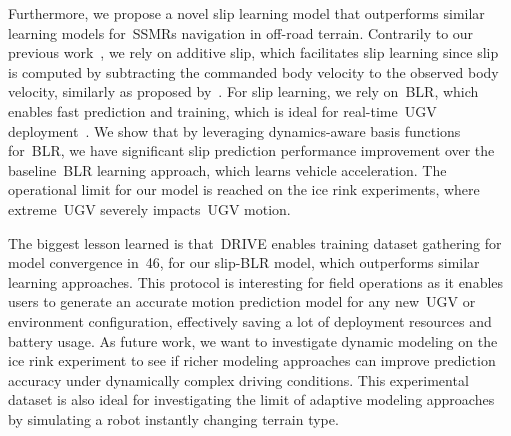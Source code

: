 \documentclass[12pt,letterpaper,oneside]{article}
\begin{document}
Furthermore, we propose a novel slip learning model that outperforms similar learning models for~\acp{SSMR} navigation in off-road terrain.
Contrarily to our previous work~\citep{Baril2020}, we rely on additive slip, which facilitates slip learning since slip is computed by subtracting the commanded body velocity to the observed body velocity, similarly as proposed by~\citet{Seegmiller2014}.
For slip learning, we rely on~\ac{BLR}, which enables fast prediction and training, which is ideal for real-time~\ac{UGV} deployment~\citep{Mckinnon2019}.
We show that by leveraging dynamics-aware basis functions for~\ac{BLR}, we have significant slip prediction performance improvement over the baseline~\ac{BLR} learning approach, which learns vehicle acceleration.
The operational limit for our model is reached on the ice rink experiments, where extreme~\ac{UGV} severely impacts~\ac{UGV} motion.

The biggest lesson learned is that~\ac{DRIVE} enables training dataset gathering for model convergence in~\SI{46}{\sec}, for our slip-\ac{BLR} model, which outperforms similar learning approaches.
This protocol is interesting for field operations as it enables users to generate an accurate motion prediction model for any new~\ac{UGV} or environment configuration, effectively saving a lot of deployment resources and battery usage.
As future work, we want to investigate dynamic modeling on the ice rink experiment to see if richer modeling approaches can improve prediction accuracy under dynamically complex driving conditions.
This experimental dataset is also ideal for investigating the limit of adaptive modeling approaches by simulating a robot instantly changing terrain type.

\begin{center}
	\textbf{}
\end{center}
\end{document}
